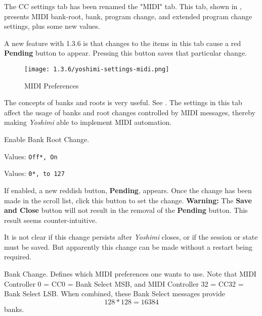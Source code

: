    The CC settings tab has been renamed the "MIDI" tab.
   This tab, shown in
   ,
   presents MIDI bank-root, bank, program change, and extended program
   change settings, plus some new values.

   A new feature with 1.3.6 is that changes to the items in this
   tab cause a red \textbf{Pending} button to appear.  Pressing this
   button saves that particular change.

\begin{figure}[H]
   \centering 
   \texttt{[image: 1.3.6/yoshimi-settings-midi.png]}
   \caption[MIDI Preferences]{MIDI Preferences}
   \label{fig:yoshimi_settings_cc}
\end{figure}

   \setcounter{ItemCounter}{0}      %

   The concepts of banks and roots is very useful.
   See .
   The settings in this tab affect the usage of banks and root changes
   controlled by MIDI messages, thereby making \textsl{Yoshimi} able to
   implement MIDI automation.

   Enable Bank Root Change.

   Values: \texttt{Off*, On}


   Values: \texttt{0*, to 127}

   If enabled, a new reddish button, \textbf{Pending}, appears.
   Once the change has been made in the scroll list, click this button
   to set the change.
   \textbf{Warning:}
   The \textbf{Save and Close} button will not result in the removal of the
   \textbf{Pending} button.  This result seems counter-intuitive.

   It is not clear if this change persists after \textsl{Yoshimi} closes, or
   if the session or state must be saved.
   But apparently this change can be made without a restart being required.

   Bank Change.
   Defines which MIDI preferences one wants to use.
   Note that MIDI Controller 0 = CC0 = Bank Select MSB, and MIDI Controller
   32 = CC32 = Bank Select LSB.
   When combined, these Bank Select messages provide \[128*128 = 16384\]
   banks.

